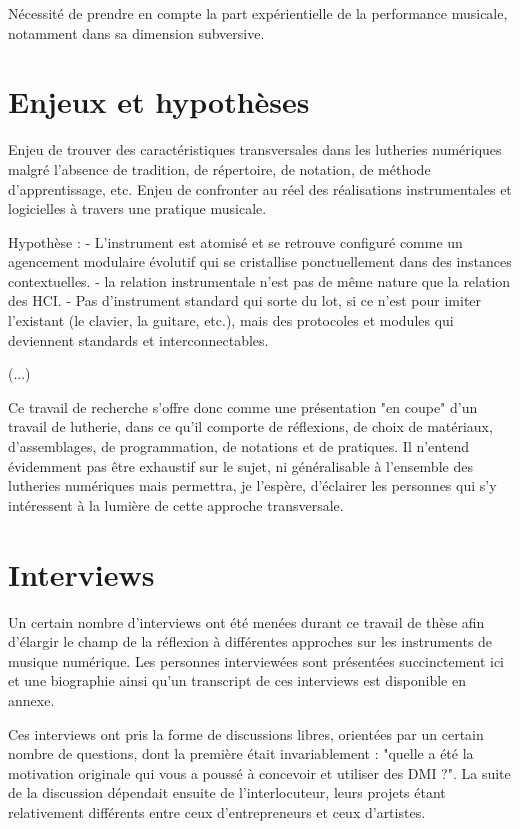 Nécessité de prendre en compte la part expérientielle de la performance musicale, notamment dans sa dimension subversive.

\section{Enjeux et hypothèses}

Enjeu de trouver des caractéristiques transversales dans les lutheries numériques malgré l'absence de tradition, de répertoire, de notation, de méthode d'apprentissage, etc.
Enjeu de confronter au réel des réalisations instrumentales et logicielles à travers une pratique musicale.

Hypothèse :
- L'instrument est atomisé et se retrouve configuré comme un agencement modulaire évolutif qui se cristallise ponctuellement dans des instances contextuelles.
- la relation instrumentale n'est pas de même nature que la relation des HCI.
- Pas d'instrument standard qui sorte du lot, si ce n'est pour imiter l'existant (le clavier, la guitare, etc.), mais des protocoles et modules qui deviennent standards et interconnectables.

(...)

%
Ce travail de recherche s'offre donc comme une présentation "en coupe" d'un travail de lutherie, dans ce qu'il comporte de réflexions, de choix de matériaux, d'assemblages, de programmation, de notations et de pratiques. Il n'entend évidemment pas être exhaustif sur le sujet, ni généralisable à l'ensemble des lutheries numériques mais permettra, je l'espère, d'éclairer les personnes qui s'y intéressent à la lumière de cette approche transversale.
%

\section{Interviews}
Un certain nombre d'interviews ont été menées durant ce travail de thèse afin d'élargir le champ de la réflexion à différentes approches sur les instruments de musique numérique. Les personnes interviewées sont présentées succinctement ici et une biographie ainsi qu'un transcript de ces interviews est disponible en annexe.

Ces interviews ont pris la forme de discussions libres, orientées par un certain nombre de questions, dont la première était invariablement : "quelle a été la motivation originale qui vous a poussé à concevoir et utiliser des DMI ?". La suite de la discussion dépendait ensuite de l'interlocuteur, leurs projets étant relativement différents entre ceux d'entrepreneurs et ceux d'artistes.

